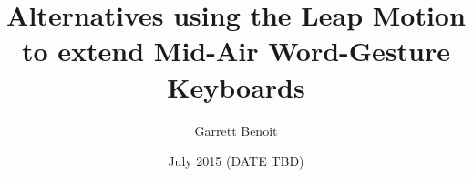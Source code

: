 \documentclass
[
]
{thesis}
\title{Alternatives using the Leap Motion to extend Mid-Air Word-Gesture Keyboards}
\author{Garrett Benoit}
\date{July 2015 (DATE TBD)}
\begin{document}
	
	
	
	
	
	
	\thesisAppendixPage 
	\begin{appendices}
		
		
	\end{appendices}
	
	
	
\end{document}
